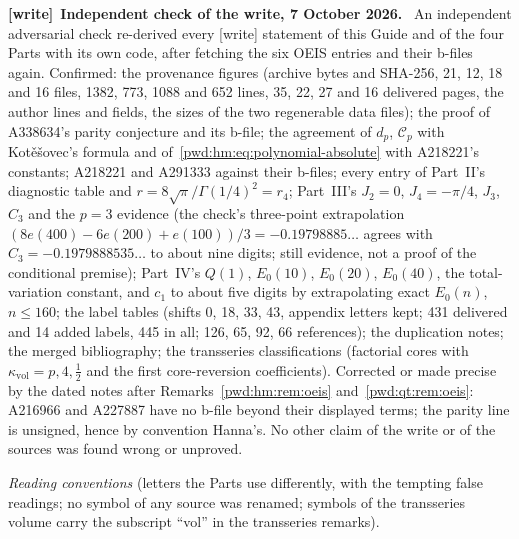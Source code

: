 \documentclass[11pt,letterpaper]{article}
\numberwithin{equation}{section}
\theoremstyle{remark}\newtheorem{remark}[theorem]{Remark}
\newcommand{\vol}{\mathrm{vol}}
\newenvironment{writenote}[1][]{\par\smallskip\begingroup\small
 \noindent\textbf{[write]}\if\relax\detokenize{#1}\relax\else~\textbf{#1.}\fi\ }%
 {\par\endgroup\smallskip}
\begin{document}
\begin{writenote}[Independent check of the write, 7 October 2026]
An independent adversarial check re-derived every [write] statement of this
Guide and of the four Parts with its own code, after fetching the six OEIS
entries and their b-files again. Confirmed: the provenance figures (archive
bytes and SHA-256, 21, 12, 18 and 16 files, 1382, 773, 1088 and 652 lines,
35, 22, 27 and 16 delivered pages, the author lines and fields, the sizes of
the two regenerable data files); the proof of A338634's parity conjecture and
its b-file; the agreement of $d_p$, $\mathcal C_p$ with Kot\v e\v sovec's
formula and of~\eqref{pwd:hm:eq:polynomial-absolute} with A218221's
constants; A218221 and A291333 against their b-files; every entry of Part~II's
diagnostic table and $r=8\sqrt\pi/\Gamma(1/4)^2=r_4$; Part~III's $J_2=0$,
$J_4=-\pi/4$, $J_3$, $C_3$ and the $p=3$ evidence (the check's three-point
extrapolation $(8e(400)-6e(200)+e(100))/3=-0.19798885\ldots$ agrees with
$C_3=-0.1979888535\ldots$ to about nine digits; still evidence, not a proof
of the conditional premise); Part~IV's $Q(1)$, $E_0(10)$, $E_0(20)$,
$E_0(40)$, the total-variation constant, and $c_1$ to about five digits by
extrapolating exact $E_0(n)$, $n\le160$; the label tables (shifts 0, 18, 33,
43, appendix letters kept; 431 delivered and 14 added labels, 445 in all;
126, 65, 92, 66 references); the duplication notes; the merged bibliography;
the transseries classifications (factorial cores with $\kappa_\vol=p,4,\tfrac12$
and the first core-reversion coefficients). Corrected or made precise by the
dated notes after Remarks~\ref{pwd:hm:rem:oeis} and~\ref{pwd:qt:rem:oeis}:
A216966 and A227887 have no b-file beyond their displayed terms; the parity
line is unsigned, hence by convention Hanna's. No other claim of the write or
of the sources was found wrong or unproved.
\end{writenote}
\medskip
\begingroup\small
\noindent\emph{Reading conventions} (letters the Parts use differently, with
the tempting false readings; no symbol of any source was renamed; symbols of
the transseries volume carry the subscript ``vol'' in the transseries
remarks).\par\smallskip
\renewcommand{\arraystretch}{1.1}
\renewcommand{\theHtable}{pwdguide.\arabic{table}}
\end{document}
